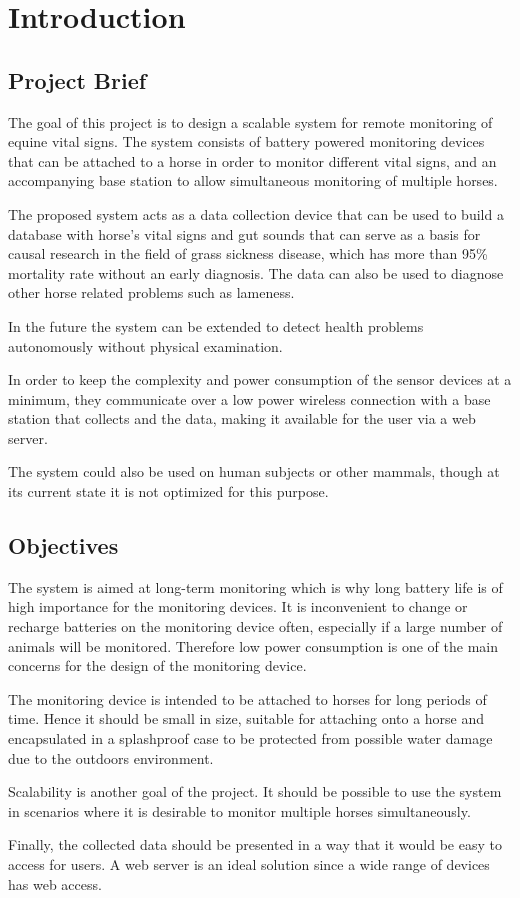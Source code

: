 \chapter{Introduction}


\section{Project Brief}
The goal of this project is to design a scalable system for remote monitoring of equine vital signs. The system consists of battery powered monitoring devices that can be attached to a horse in order to monitor different vital signs, and an accompanying base station to allow simultaneous monitoring of multiple horses. 

The proposed system acts as a data collection device that can be used to build a database with horse's vital signs and gut sounds that can serve as a basis for causal research in the field of grass sickness disease, which has more than 95\% mortality rate without an early diagnosis\cite{robinson2009current}. The data can also be used to diagnose other horse related problems such as lameness.

In the future the system can be extended to detect health problems autonomously without physical examination.

In order to keep the complexity and power consumption of the sensor devices at a minimum, they communicate over a low power wireless connection with a base station that collects and the data, making it available for the user via a web server.

The system could also be used on human subjects or other mammals, though at its current state it is not optimized for this purpose.


\section{Objectives}
The system is aimed at long-term monitoring which is why long battery life is of high importance for the monitoring devices. It is inconvenient to change or recharge batteries on the monitoring device often, especially if a large number of animals will be monitored. Therefore low power consumption is one of the main concerns for the design of the monitoring device.

The monitoring device is intended to be attached to horses for long periods of time. Hence it should be small in size, suitable for attaching onto a horse and encapsulated in a splashproof case to be protected from possible water damage due to the outdoors environment.

Scalability is another goal of the project. It should be possible to use the system in scenarios where it is desirable to monitor multiple horses simultaneously. 

Finally, the collected data should be presented in a way that it would be easy to access for users. A web server is an ideal solution since a wide range of devices has web access.   
